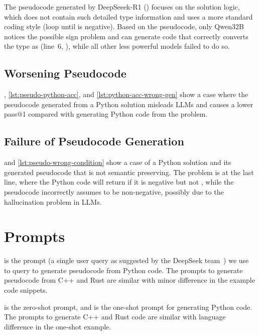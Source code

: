The pseudocode generated by DeepSeeek-R1 () focuses on the solution logic, which does not contain such detailed type information and uses a more standard coding style (loop until  is negative).
Based on the pseudocode, only Qwen32B notices the possible sign problem and can generate code that correctly converts the type as  (line~6, ), while all other less powerful models failed to do so.



\subsection{Worsening Pseudocode}\label{subsec:worsening}
, \ref{lst:pseudo-python-acc}, and \ref{lst:python-acc-wrong-gen} show a case where the pseudocode generated from a Python solution misleads LLMs and causes a lower pass@1 compared with generating Python code from the problem.

\subsection{Failure of Pseudocode Generation}\label{subsec:fail-pseudogen}
 and \ref{lst:pseudo-wrong-condition} show a case of a Python solution and its generated pseudocode that is not semantic preserving.
The problem is at the last line, where the Python code will return  if it is negative but not , while the pseudocode incorrectly assumes  to be non-negative, possibly due to the hallucination problem in LLMs.


\section{Prompts}\label{sec:prompts}
 is the prompt (a single user query as suggested by the DeepSeek team~\cite{ds-r1}) we use to query \dsr to generate pseudocode from Python code.
The prompts to generate pseudocode from C++ and Rust are similar with minor difference in the example code snippets.

 is the zero-shot prompt, and  is the one-shot prompt for generating Python code.
The prompts to generate C++ and Rust code are similar with language difference in the one-shot example.

